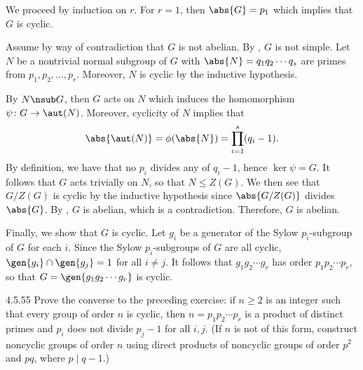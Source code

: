\begin{sol}
	We proceed by induction on $r$.
	For $r = 1$, then $\abs{G} = p_1$ which implies that $G$ is cyclic.

	Assume by way of contradiction that $G$ is not abelian.
	By , $G$ is not simple.
	Let $N$ be a nontrivial normal subgroup of $G$ with $\abs{N} = q_1q_2 \cdots q_s$ are primes from $p_1, p_2, \ldots, p_r$.
	Moreover, $N$ is cyclic by the inductive hypothesis.

	By $N \nsub G$, then $G$ acts on $N$ which induces the homomorphism $\psi \colon G \to \aut(N)$.
	Moreover, cyclicity of $N$ implies that
	\[
		\abs{\aut(N)} = \phi(\abs{N}) = \prod_{i = 1}^s (q_i - 1).
	\]
	By definition, we have that no $p_i$ divides any of $q_i - 1$, hence $\ker\psi = G$.
	It follows that $G$ acts trivially on $N$, so that $N \leq Z(G)$.
	We then see that $G/Z(G)$ is cyclic by the inductive hypothesis since $\abs{G/Z(G)}$ divides $\abs{G}$.
	By , $G$ is abelian, which is a contradiction.
	Therefore, $G$ is abelian.

	Finally, we show that $G$ is cyclic.
	Let $g_i$ be a generator of the Sylow $p_i$-subgroup of $G$ for each $i$.
	Since the Sylow $p_i$-subgroups of $G$ are all cyclic, $\gen{g_i} \cap \gen{g_j} = 1$ for all $i \neq j$.
	It follows that $g_1g_2 \cdots g_r$ has order $p_1p_2 \cdots p_r$, so that $G = \gen{g_1g_2 \cdots g_r}$ is cyclic.
\end{sol}

\begin{exercise}{4.5.55}
	Prove the converse to the preceding exercise: if $n \geq 2$ is an integer such that every group of order $n$ is cyclic, then $n = p_1p_2 \cdots p_r$ is a product of distinct primes and $p_i$ does not divide $p_j - 1$ for all $i, j$. (If $n$ is not of this form, construct noncyclic groups of order $n$ using direct products of noncyclic groups of order $p^2$ and $pq$, where $p \mid q - 1$.)
\end{exercise}

